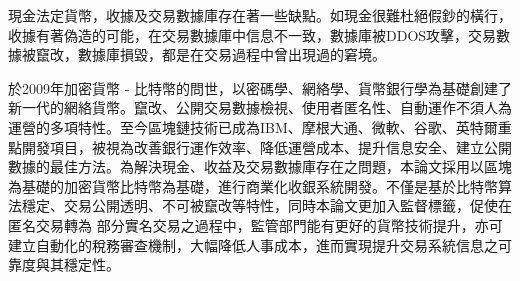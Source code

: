 

現金法定貨幣，收據及交易數據庫存在著一些缺點。如現金很難杜絕假鈔的橫行，收據有著偽造的可能，在交易數據庫中信息不一致，數據庫被DDOS攻擊，交易數據被竄改，數據庫損毀，都是在交易過程中曾出現過的窘境。

於2009年加密貨幣 - 比特幣的問世，以密碼學、網絡學、貨幣銀行學為基礎創建了新一代的網絡貨幣。竄改、公開交易數據檢視、使用者匿名性、自動運作不須人為運營的多項特性。至今區塊鏈技術已成為IBM、摩根大通、微軟、谷歌、英特爾重點開發項目，被視為改善銀行運作效率、降低運營成本、提升信息安全、建立公開數據的最佳方法。為解決現金、收益及交易數據庫存在之問題，本論文採用以區塊為基礎的加密貨幣比特幣為基礎，進行商業化收銀系統開發。不僅是基於⽐特幣算法穩定、交易公開透明、不可被竄改等特性，同時本論⽂更加⼊監督標籤，促使在匿名交易轉為
部分實名交易之過程中，監管部⾨能有更好的貨幣技術提升，亦可建立自動化的稅務審查機制，大幅降低人事成本，進而實現提升交易系統信息之可靠度與其穩定性。